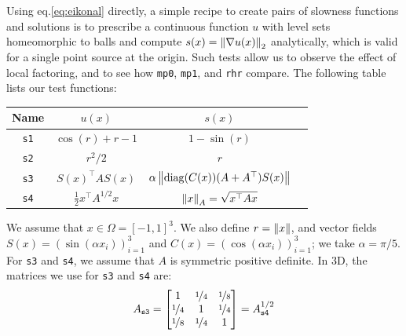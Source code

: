 \documentclass[smallcondensed]{svjour3}
\begin{document}
Using eq.\@ \ref{eq:eikonal} directly, a simple recipe to create
pairs of slowness functions and solutions is to prescribe a continuous
function $u$ with level sets homeomorphic to balls and compute
$s(x) = \left\|\nabla u(x)\right\|_2$ analytically, which is valid for a
single point source at the origin. Such tests allow us to observe the
effect of local factoring, and to see how \texttt{mp0}, \texttt{mp1},
and \texttt{rhr} compare. The following table lists our test
functions: \vspace{0.5em}
\begin{center}
  \begin{tabular}{cccc}
    Name & $u(x)$ & $s(x)$ \\
    \midrule
    \texttt{s1} & $\cos(r) + r - 1$ & $1 - \sin(r)$ \\
    \texttt{s2} & $r^2/2$ & $r$ \\
    \texttt{s3} & $S(x)^\top A S(x)$ & $\alpha\left\|\operatorname{diag}(C(x)){(A + A^\top)}S(x)\right\|$ \\
    \texttt{s4} & $\tfrac{1}{2} x^\top A^{1/2} x$ & $\left\|x\right\|_A = \sqrt{x^\top A x}$
  \end{tabular}
\end{center}
\vspace{0.5em} We assume that $x \in \Omega = [-1, 1]^3$. We also
define $r = \left\|x\right\|$, and vector fields
$S(x) = (\sin(\alpha x_i))_{i=1}^3$ and
$C(x) = (\cos(\alpha x_i))_{i=1}^3$; we take $\alpha = \pi/5$. For
\texttt{s3} and \texttt{s4}, we assume that $A$ is symmetric positive
definite. In 3D, the matrices we use for \texttt{s3} and \texttt{s4}
are:\begin{equation} A_{\texttt{s3}} = \begin{bmatrix}
    1 & \nicefrac{1}{4} & \nicefrac{1}{8} \\
    \nicefrac{1}{4} & 1 & \nicefrac{1}{4} \\
    \nicefrac{1}{8} & \nicefrac{1}{4} & 1
  \end{bmatrix} = A_{\texttt{s4}}^{1/2}
\end{equation}
\end{document}
